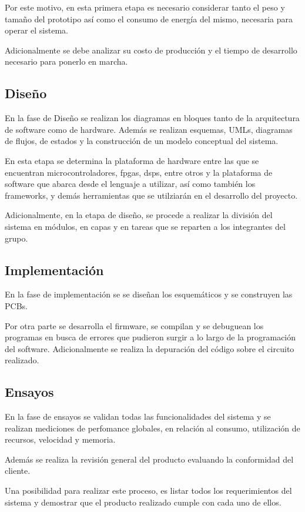 Por este motivo, en esta primera etapa es necesario considerar tanto el peso y tamaño del prototipo así como el consumo de energía del mismo, necesaria para operar el sistema.

Adicionalmente se debe analizar su costo de producción y el tiempo de desarrollo necesario para ponerlo en marcha.


\subsection{Diseño}
En la fase de Diseño se realizan los diagramas en bloques tanto de la arquitectura de software como de hardware. Además se realizan esquemas, UMLs, diagramas de flujos, de estados y la construcción de un modelo conceptual del sistema.

En esta etapa se determina la plataforma de hardware entre las que se encuentran microcontroladores, fpgas, dsps, entre otros y la plataforma de software que abarca desde el lenguaje a utilizar, así como también los frameworks, y demás herramientas que se utilziarán en el desarrollo del proyecto.

Adicionalmente, en la etapa de diseño, se procede a realizar la división del sistema en módulos, en capas y en tareas que se reparten a los integrantes del grupo.


\subsection{Implementación}
En la fase de implementación se se diseñan los esquemáticos y se construyen las PCBs.

Por otra parte se desarrolla el firmware, se compilan y se debuguean los programas en busca de errores que pudieron surgir a lo largo de la programación del software.
Adicionalmente se realiza la depuración del código sobre el circuito realizado.


\subsection{Ensayos}
En la fase de ensayos se validan todas las funcionalidades del sistema y se realizan mediciones de perfomance globales, en relación al consumo, utilización de recursos, velocidad y memoria.

Además se realiza la revisión general del producto evaluando la conformidad del cliente.

Una posibilidad para realizar este proceso, es listar todos los requerimientos del sistema y demostrar que el producto realizado cumple con cada uno de ellos.


